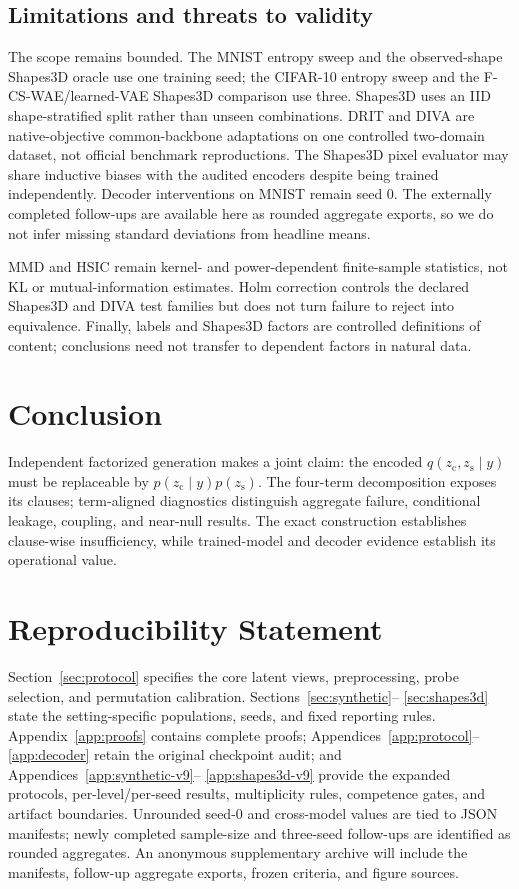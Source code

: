 \documentclass{article}
\newcommand{\zc}{z_{\mathrm{c}}}
\newcommand{\zs}{z_{\mathrm{s}}}
\begin{document}
\subsection{Limitations and threats to validity}

The scope remains bounded.  The MNIST entropy sweep and the observed-shape
Shapes3D oracle use one training seed; the CIFAR-10 entropy sweep and the
F-CS-WAE/learned-VAE Shapes3D comparison use three.  Shapes3D uses an IID
shape-stratified split rather than unseen combinations.  DRIT and DIVA are
native-objective common-backbone
adaptations on one controlled two-domain dataset, not official benchmark
reproductions.  The Shapes3D pixel evaluator may share inductive biases with
the audited encoders despite being trained independently.  Decoder
interventions on MNIST remain seed 0.  The externally completed follow-ups are available here as rounded aggregate
exports, so we do not infer missing standard deviations from headline means.

MMD and HSIC remain kernel- and power-dependent finite-sample statistics, not
KL or mutual-information estimates.  Holm
correction controls the declared Shapes3D and DIVA test families but does not
turn failure to reject into equivalence.  Finally, labels and Shapes3D factors are controlled
definitions of content; conclusions need not transfer to dependent factors
in natural data.

\section{Conclusion}

Independent factorized generation makes a joint claim: the encoded
$q(\zc,\zs\mid y)$ must be replaceable by $p(\zc\mid y)p(\zs)$.  The
four-term decomposition exposes its clauses; term-aligned diagnostics
distinguish aggregate failure, conditional leakage, coupling, and near-null
results.  The exact construction establishes clause-wise insufficiency, while
trained-model and decoder evidence establish its operational value.

\clearpage
\section*{Reproducibility Statement}

Section~\ref{sec:protocol} specifies the core latent views, preprocessing,
probe selection, and permutation calibration.  Sections~\ref{sec:synthetic}--
\ref{sec:shapes3d} state the setting-specific populations, seeds, and fixed
reporting rules.  Appendix~\ref{app:proofs} contains complete proofs;
Appendices~\ref{app:protocol}--\ref{app:decoder} retain the original
checkpoint audit; and Appendices~\ref{app:synthetic-v9}--
\ref{app:shapes3d-v9} provide the expanded protocols, per-level/per-seed
results, multiplicity rules, competence gates, and artifact boundaries.
Unrounded seed-0 and cross-model values are tied to JSON manifests; newly
completed sample-size and three-seed follow-ups are identified as rounded
aggregates.  An anonymous supplementary archive will include the manifests,
follow-up aggregate exports, frozen criteria, and figure sources.
\end{document}
